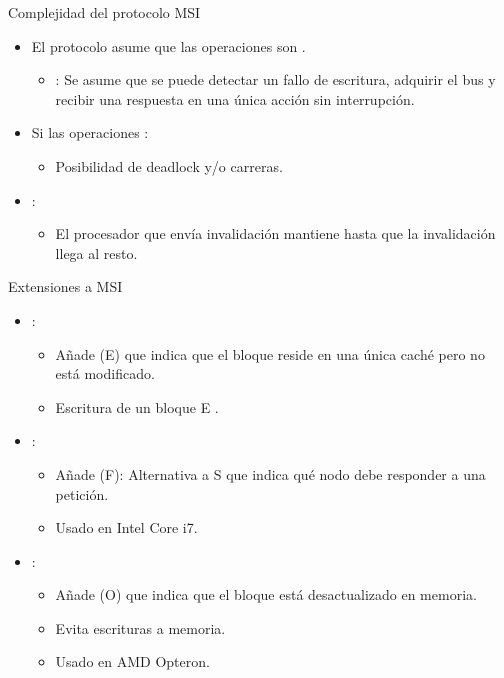 \begin{frame}[t]{Complejidad del protocolo MSI}
\begin{itemize}
  \item El protocolo asume que las operaciones son .
    \begin{itemize}
      \item {}: Se asume que se puede detectar un fallo de escritura, 
            adquirir el bus y recibir una respuesta en una única acción sin interrupción.
    \end{itemize}

  \item Si las operaciones :
    \begin{itemize}
      \item Posibilidad de deadlock y/o carreras.
    \end{itemize}

  \item {}:
    \begin{itemize}
      \item El procesador que envía invalidación mantiene 
             hasta que la invalidación 
            llega al resto.
    \end{itemize}
\end{itemize}
\end{frame}

\begin{frame}[t]{Extensiones a MSI}
\begin{itemize}
  \pause
  \item {}:
    \begin{itemize}
       \item Añade  (E) que indica 
             que el bloque reside en una única caché pero no está modificado.
       \item Escritura de un bloque E .
    \end{itemize}

  \item {}:
    \begin{itemize}
      \item Añade  (F): Alternativa a S que indica qué nodo debe responder a una petición.
      \item Usado en Intel Core i7.
    \end{itemize}

  \item {}:
    \begin{itemize}
      \item Añade  (O) que indica que el bloque está desactualizado en memoria.
      \item Evita escrituras a memoria.
      \item Usado en AMD Opteron.
    \end{itemize}
\end{itemize}
\end{frame}
